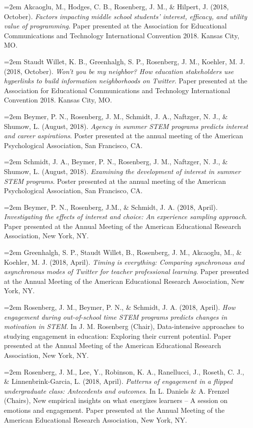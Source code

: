 \documentclass[
  14,
]{article}
\begin{document}
\hangindent=2em Akcaoglu, M., Hodges, C. B., Rosenberg, J. M., \&
Hilpert, J. (2018, October). \emph{Factors impacting middle school
students' interest, efficacy, and utility value of programming}. Paper
presented at the Association for Educational Communications and
Technology International Convention 2018. Kansas City, MO.

\hangindent=2em Staudt Willet, K. B., Greenhalgh, S. P., Rosenberg, J.
M., Koehler, M. J. (2018, October). \emph{Won't you be my neighbor? How
education stakeholders use hyperlinks to build information neighborhoods
on Twitter}. Paper presented at the Association for Educational
Communications and Technology International Convention 2018. Kansas
City, MO.

\hangindent=2em Beymer, P. N., Rosenberg, J. M., Schmidt, J. A.,
Naftzger, N. J., \& Shumow, L. (August, 2018). \emph{Agency in summer
STEM programs predicts interest and career aspirations}. Poster
presented at the annual meeting of the American Psychological
Association, San Francisco, CA.

\hangindent=2em Schmidt, J. A., Beymer, P. N., Rosenberg, J. M.,
Naftzger, N. J., \& Shumow, L. (August, 2018). \emph{Examining the
development of interest in summer STEM programs}. Poster presented at
the annual meeting of the American Psychological Association, San
Francisco, CA.

\hangindent=2em Beymer, P. N., Rosenberg, J.M., \& Schmidt, J. A. (2018,
April). \emph{Investigating the effects of interest and choice: An
experience sampling approach}. Paper presented at the Annual Meeting of
the American Educational Research Association, New York, NY.

\hangindent=2em Greenhalgh, S. P., Staudt Willet, B., Rosenberg, J. M.,
Akcaoglu, M., \& Koehler, M. J. (2018, April). \emph{Timing is
everything: Comparing synchronous and asynchronous modes of Twitter for
teacher professional learning}. Paper presented at the Annual Meeting of
the American Educational Research Association, New York, NY.

\hangindent=2em Rosenberg, J. M., Beymer, P. N., \& Schmidt, J. A.
(2018, April). \emph{How engagement during out-of-school time STEM
programs predicts changes in motivation in STEM}. In J. M. Rosenberg
(Chair), Data-intensive approaches to studying engagement in education:
Exploring their current potential. Paper presented at the Annual Meeting
of the American Educational Research Association, New York, NY.

\hangindent=2em Rosenberg, J. M., Lee, Y., Robinson, K. A., Ranellucci,
J., Roseth, C. J., \& Linnenbrink-Garcia, L. (2018, April).
\emph{Patterns of engagement in a flipped undergraduate class:
Antecedents and outcomes}. In L. Daniels \& A. Frenzel (Chairs), New
empirical insights on what energizes learners -- A session on emotions
and engagement. Paper presented at the Annual Meeting of the American
Educational Research Association, New York, NY.
\end{document}

